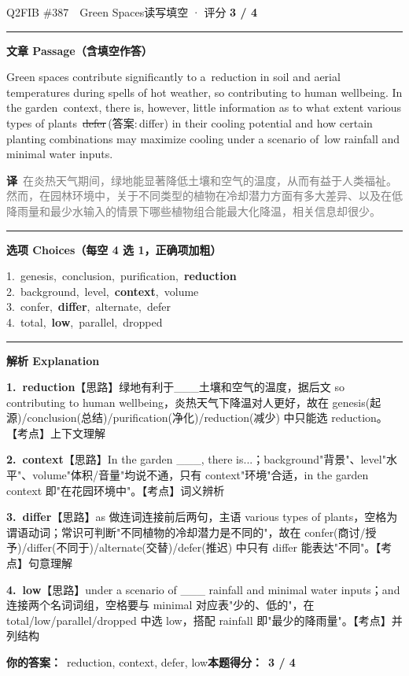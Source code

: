 \documentclass[11pt]{article}
\newcommand{\ptesub}[1]{%
  \par\needspace{2\baselineskip}\smallskip
  {\color{cAccent}\rule[-0.2ex]{3pt}{1.05em}}\hspace{6pt}%
  {\bfseries\color{cHead}#1}\par\nopagebreak\smallskip}
\newcommand{\zh}[1]{{\footnotesize\textcolor{cNote}{\textbf{译}}\ \textcolor{gray}{#1}}}
\newcommand{\rok}[1]{{\color{cFix}\ding{51}\,#1}}                 %
\newcommand{\rno}[2]{{\color{cWrong}\ding{55}\,\sout{#1}}\,{\footnotesize\color{cFix}(答案:\,#2)}}  %
\begin{document}
\begin{qblock}{Q2\quad FIB \#387\ \ Green Spaces}{读写填空 · 评分 \textcolor{cAccent}{\bfseries 3 / 4}}
\ptesub{文章 Passage（含填空作答）}
\begin{promptbox}
Green spaces contribute significantly to a \rok{reduction} in soil and aerial temperatures during spells of hot weather, so contributing to human wellbeing. In the garden \rok{context}, there is, however, little information as to what extent various types of plants \rno{defer}{differ} in their cooling potential and how certain planting combinations may maximize cooling under a scenario of \rok{low} rainfall and minimal water inputs.
\end{promptbox}
\zh{在炎热天气期间，绿地能显著降低土壤和空气的温度，从而有益于人类福祉。然而，在园林环境中，关于不同类型的植物在冷却潜力方面有多大差异、以及在低降雨量和最少水输入的情景下哪些植物组合能最大化降温，相关信息却很少。}
\ptesub{选项 Choices（每空 4 选 1，正确项加粗）}
{\small
1.\ genesis,\ conclusion,\ purification,\ \textbf{reduction}\\
2.\ background,\ level,\ \textbf{context},\ volume\\
3.\ confer,\ \textbf{differ},\ alternate,\ defer\\
4.\ total,\ \textbf{low},\ parallel,\ dropped}
\ptesub{解析 Explanation}
\begin{notebox}\footnotesize
\textbf{1.\ reduction}\quad【思路】绿地有利于\_\_\_土壤和空气的温度，据后文 so contributing to human wellbeing，炎热天气下降温对人更好，故在 genesis(起源)/conclusion(总结)/purification(净化)/reduction(减少) 中只能选 reduction。【考点】上下文理解\par\smallskip
\textbf{2.\ context}\quad【思路】In the garden \_\_\_, there is...；background"背景"、level"水平"、volume"体积/音量"均说不通，只有 context"环境"合适，in the garden context 即"在花园环境中"。【考点】词义辨析\par\smallskip
\textbf{3.\ differ}\quad【思路】as 做连词连接前后两句，主语 various types of plants，空格为谓语动词；常识可判断"不同植物的冷却潜力是不同的"，故在 confer(商讨/授予)/differ(不同于)/alternate(交替)/defer(推迟) 中只有 differ 能表达"不同"。【考点】句意理解\par\smallskip
\textbf{4.\ low}\quad【思路】under a scenario of \_\_\_ rainfall and minimal water inputs；and 连接两个名词词组，空格要与 minimal 对应表"少的、低的"，在 total/low/parallel/dropped 中选 low，搭配 rainfall 即"最少的降雨量"。【考点】并列结构
\end{notebox}
\smallskip
\textbf{你的答案：}\ reduction, context, {\color{cWrong}defer}, low\qquad\textbf{本题得分：}\ {\color{cAccent}\bfseries 3 / 4}
\end{qblock}
\end{document}

